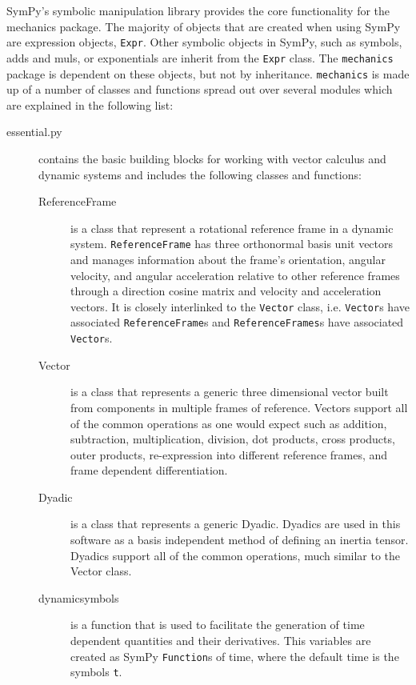 \documentclass[twocolumn,10pt]{asme2e}
\begin{document}
SymPy's symbolic manipulation library provides the core functionality for the
mechanics package. The majority of objects that are created when using SymPy
are expression objects, \verb|Expr|.  Other symbolic objects in SymPy, such as
symbols, adds and muls, or exponentials are inherit from the \verb|Expr| class.
The \verb|mechanics| package is dependent on these objects, but not by
inheritance. \verb|mechanics| is made up of a number of classes and functions
spread out over several modules which are explained in the following list:
%
\begin{description}
  \item[essential.py] contains the basic building blocks for working with
    vector calculus and dynamic systems and includes the following classes and
    functions:
    \begin{description}
      \item[ReferenceFrame] is a class that represent a rotational reference
        frame in a dynamic system. \verb|ReferenceFrame| has three orthonormal
        basis unit vectors and manages information about the frame's
        orientation, angular velocity, and angular acceleration relative to
        other reference frames through a direction cosine matrix and velocity
        and acceleration vectors. It is closely interlinked to the
        \verb|Vector| class, i.e. \verb|Vector|s have associated
        \verb|ReferenceFrame|s and \verb|ReferenceFrames|s have associated
        \verb|Vector|s.
      \item[Vector] is a class that represents a generic three dimensional
        vector built from components in multiple frames of reference. Vectors
        support all of the common operations as one would expect such as
        addition, subtraction, multiplication, division, dot products, cross
        products, outer products, re-expression into different reference
        frames, and frame dependent differentiation.
      \item[Dyadic] is a class that represents a generic Dyadic. Dyadics are
        used in this software as a basis independent method of defining an
        inertia tensor. Dyadics support all of the common operations, much
        similar to the Vector class.
      \item[dynamicsymbols] is a function that is used to facilitate the generation
        of time dependent quantities and their derivatives. This variables are
        created as SymPy \verb|Function|s of time, where the default time is
        the symbols \verb|t|.

\end{description}
\end{description}
\end{document}
